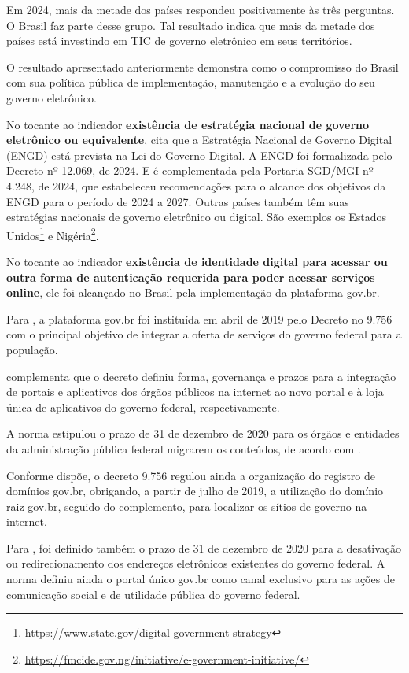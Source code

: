 Em 2024, mais da metade dos países respondeu positivamente às três perguntas. O Brasil faz parte desse grupo. Tal resultado indica que mais da metade dos países está investindo em TIC de governo eletrônico em seus territórios.

O resultado apresentado anteriormente demonstra como o compromisso do Brasil com sua política pública de implementação, manutenção e a evolução do seu governo eletrônico.

No tocante ao indicador \textbf{existência de estratégia nacional de governo
eletrônico ou equivalente}, \cite{brasil_engd} cita que a Estratégia Nacional de Governo Digital (ENGD) está prevista na Lei do Governo Digital. A ENGD foi formalizada pelo Decreto nº 12.069, de 2024. E é complementada pela Portaria SGD/MGI nº 4.248, de 2024, que estabeleceu recomendações para o alcance dos objetivos da ENGD para o período de 2024 a 2027. Outras países também têm suas estratégias nacionais de governo eletrônico ou digital. São exemplos os Estados Unidos\footnote{\url{https://www.state.gov/digital-government-strategy}} e Nigéria\footnote{\url{https://fmcide.gov.ng/initiative/e-government-initiative/}}.

No tocante ao indicador \textbf{existência de identidade digital para acessar
ou outra forma de autenticação requerida para poder acessar serviços online}, ele foi alcançado no Brasil pela implementação da plataforma gov.br. 

Para \cite{mitkiewicz2024transformaccao}, a plataforma gov.br foi instituída em abril de 2019 pelo Decreto no 9.756 com o principal objetivo de integrar a oferta de serviços do governo federal para a população. 

\cite{mitkiewicz2024transformaccao} complementa que o decreto definiu forma, governança e prazos para a integração de portais e aplicativos dos órgãos públicos na internet ao novo portal e à loja única de aplicativos do governo federal, respectivamente. 

A norma estipulou o prazo de 31 de dezembro de 2020 para os órgãos e entidades da administração pública federal migrarem os conteúdos, de acordo com \cite{mitkiewicz2024transformaccao}.

Conforme \cite{mitkiewicz2024transformaccao} dispõe, o decreto 9.756 regulou ainda a organização do registro de domínios gov.br, obrigando, a partir de julho de 2019, a utilização do domínio raiz gov.br, seguido do complemento, para localizar os sítios de governo na internet. 

Para \cite{mitkiewicz2024transformaccao}, foi definido também o prazo de 31 de dezembro de 2020 para a desativação ou redirecionamento dos endereços eletrônicos existentes do governo federal. A norma definiu ainda o portal único gov.br como canal exclusivo para as ações de comunicação social e de utilidade pública do governo federal.

